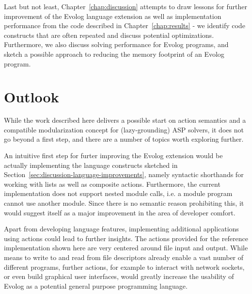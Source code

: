 Last but not least, Chapter~\ref{chap:discussion} attempts to draw lessons for further improvement of the Evolog language extension as well as implementation performance from the code described in Chapter~\ref{chap:results} - we identify code constructs that are often repeated and discuss potential optimizations. Furthermore, we also discuss solving performance for Evolog programs, and sketch a possible approach to reducing the memory footprint of an Evolog program.

\section{Outlook}

While the work described here delivers a possible start on action semantics and a compatible modularization concept for (lazy-grounding) ASP solvers, it does not go beyond a first step, and there are a number of topics worth exploring further.

An intuitive first step for furter improving the Evolog extension would be actually implementing the language constructs sketched in Section~\ref{sec:discussion-language-improvements}, namely syntactic shorthands for working with lists as well as composite actions. Furthermore, the current implementation does not support nested module calls, i.e. a module program cannot use another module. Since there is no semantic reason prohibiting this, it would suggest itself as a major improvement in the area of developer comfort.

Apart from developing language features, implementing additional applications using actions could lead to further insights. The actions provided for the reference implementation shown here are very centered around file input and output. While means to write to and read from file descriptors already enable a vast number of different programs, further actions, for example to interact with network sockets, or even build graphical user interfaces, would greatly increase the usability of Evolog as a potential general purpose programming language.